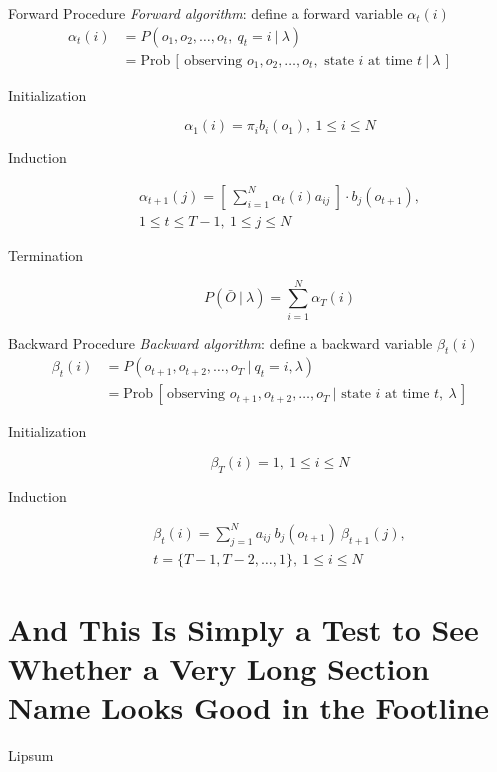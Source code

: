 \documentclass[10pt]{beamer}
\begin{document}
\begin{frame}{Forward Procedure}
  \textit{Forward algorithm}: define a forward variable $\alpha_t(i)$
  \begin{align}
    \alpha_t (i)
     & = P(o_1, o_2, \dots, o_t,\ q_t = i\ |\ \lambda)                                                              \\
     & = \text{Prob}\,[\,\text{observing } o_1, o_2, \dots, o_t, \text{ state } i \text{ at time } t\ |\ \lambda\,]
  \end{align}

  \begin{description}
    \item[Initialization]
          \begin{equation}
            \alpha_1(i) = \pi_i b_i (o_1),\ 1 \leq i \leq N
          \end{equation}
    \item[Induction]
          \begin{multline}
            \alpha_{t+1}(j) = \left[\ \sum_{i=1}^{N} \alpha_t(i) a_{i j}\ \right] \cdot b_j(o_{t+1}),\\
            1 \leq t \leq T-1,\ 1 \leq j \leq N
          \end{multline}
    \item[Termination]
          \begin{equation}
            P\left( \bar{O}\ |\ \lambda \right) = \sum_{i=1}^{N} \alpha_T(i)
          \end{equation}
  \end{description}
\end{frame}

\begin{frame}{Backward Procedure}
  \textit{Backward algorithm}: define a backward variable $\beta_t(i)$
  \begin{align}
    \beta_t(i)
     & = P(o_{t+1}, o_{t+2}, \dots, o_T\ |\ q_t = i, \lambda)                                                               \\
     & = \text{Prob}\,[\,\text{observing } o_{t+1}, o_{t+2}, \dots, o_T\ | \text{ state } i \text{ at time } t,\ \lambda\,]
  \end{align}

  \begin{description}
    \item[Initialization]
          \begin{equation}
            \beta_T(i) = 1,\ 1 \leq i \leq N
          \end{equation}
    \item[Induction]
          \begin{multline}
            \beta_{t}(i) = \sum_{j=1}^{N} a_{i j}\ b_j (o_{t+1})\  \beta_{t+1}(j),\\
            t = \{ T-1, T-2, \dots, 1\},\ 1 \leq i \leq N
          \end{multline}
  \end{description}
\end{frame}

\section{And This Is Simply a Test to See Whether a Very Long Section Name Looks Good in the Footline}

\begin{frame}{Lipsum}
  \lipsum[1]
\end{frame}
\end{document}

